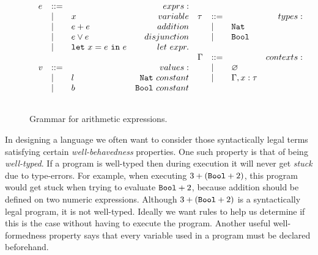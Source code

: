 \begin{figure}[h]

\[
\begin{array}{c}

\begin{array}{lllr}

e & ::= & ~ & exprs: \\
	& | & x & variable \\
	& | & e + e & addition \\
	& | & e \lor e & disjunction \\
	& | & \mathtt{let}~ x = e~\mathtt{in}~ e & let~expr. \\
	&&\\
	
v & ::= & ~ & values: \\
	& | & l & \mathtt{Nat}~constant \\
	& | & b & \mathtt{Bool}~constant \\
	&&\\

\end{array}

\begin{array}{lllr}

\tau & ::= & ~ & types: \\
	& | & \mathtt{Nat} \\
	& | & \mathtt{Bool} \\
	&&\\
	
\Gamma & ::= & ~ & contexts: \\
	& | & \varnothing \\
	& | & \Gamma, x: \tau \\
	&&\\

\end{array}

\end{array}
\]

\vspace{-12pt}
\caption{Grammar for arithmetic expressions.}
\label{A sample. }
\end{figure}

In designing a language we often want to consider those syntactically legal terms satisfying certain \textit{well-behavedness} properties. One such property is that of being \textit{well-typed}. If a program is well-typed then during execution it will never get \textit{stuck} due to type-errors. For example, when executing $3 + (\mathtt{Bool} + 2)$, this program would get stuck when trying to evaluate $\mathtt{Bool} + 2$, because addition should be defined on two numeric expressions. Although $3 + (\mathtt{Bool} + 2)$ is a syntactically legal program, it is not well-typed. Ideally we want rules to help us determine if this is the case without having to execute the program. Another useful well-formedness property says that every variable used in a program must be declared beforehand.

